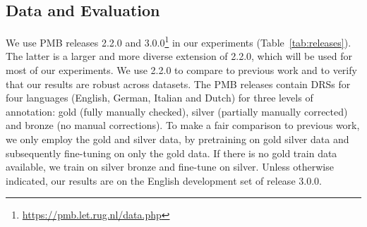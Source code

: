\documentclass[11pt,a4paper]{article}
\begin{document}
\subsection{Data and Evaluation}
\label{sec:data}


We use PMB releases 2.2.0 and 3.0.0\footnote{\url{https://pmb.let.rug.nl/data.php}} in our experiments (Table~\ref{tab:releases}). The latter is a larger and more diverse extension of 2.2.0, which will be used for most of our experiments. We use 2.2.0 to compare to previous work and to verify that our results are robust across datasets. The PMB releases contain DRSs for four languages (English, German, Italian and Dutch) for three levels of annotation: gold (fully manually checked), silver (partially manually corrected) and bronze (no manual corrections). To make a fair comparison to previous work, we only employ the gold and silver data, by pretraining on gold  silver data and subsequently fine-tuning on only the gold data. If there is no gold train data available, we train on silver  bronze and fine-tune on silver. Unless otherwise indicated, our results are on the English development set of release 3.0.0.

\begin{table}[!t]
\centering
\setlength{\tabcolsep}{4pt}
\caption{Number of documents for the four languages, for the two PMB releases considered.\label{tab:releases}}
\end{table}
\end{document}
